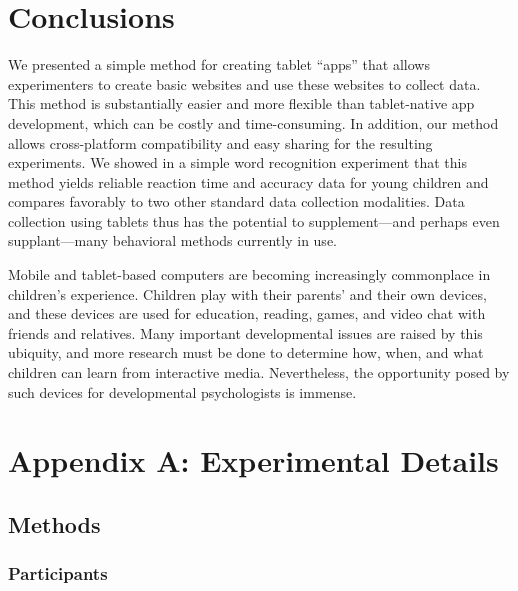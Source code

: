 \documentclass[man,noapacite]{apa2}
\begin{document}
\section{Conclusions} 

We presented a simple method for creating tablet ``apps'' that allows experimenters to create basic websites and use these websites to collect data. This method is substantially easier and more flexible than tablet-native app development, which can be costly and time-consuming. In addition, our method allows cross-platform compatibility and easy sharing for the resulting experiments. We showed in a simple word recognition experiment that this method yields reliable reaction time and accuracy data for young children and compares favorably to two other standard data collection modalities. Data collection using tablets thus has the potential to supplement---and perhaps even supplant---many behavioral methods currently in use. 

Mobile and tablet-based computers are becoming increasingly commonplace in children's experience. Children play with their parents' and their own devices, and these devices are used for education, reading, games, and video chat with friends and relatives. Many important developmental issues are raised by this ubiquity, and more research must be done to determine how, when, and what children can learn from interactive media. Nevertheless, the opportunity posed by such devices for developmental psychologists is immense.

\newpage




\newpage

\theappendix

\section{Appendix A: Experimental Details}

\subsection{Methods}

\subsubsection{Participants}                                                                                                                              
\end{document}
